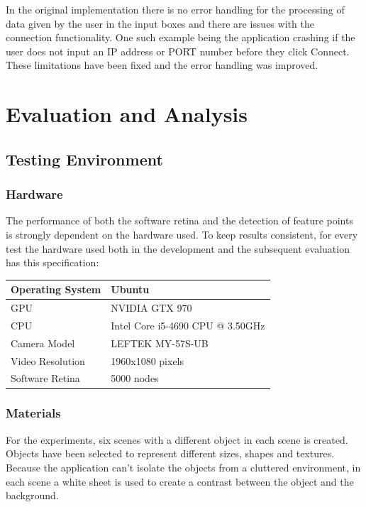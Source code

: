 \documentclass{l4proj}
\begin{document}
In the original implementation there is no error handling for the processing of data given by the user in the input boxes and there are issues with the connection functionality. One such example being the application crashing if the user does not input an IP address or PORT number before they click Connect. 
These limitations have been fixed and the error handling was improved.  









\chapter{Evaluation and Analysis}

\section{Testing Environment}
\subsection{Hardware}

The performance of both the software retina and the detection of feature points is strongly dependent on the hardware used. To keep results consistent, for every test the hardware used both in the development and the subsequent evaluation has this specification:

\begin{table}[H]
\centering
\begin{tabular}{l|l}
Operating System & Ubuntu\\ \hline
GPU & NVIDIA GTX 970 \\ \hline
CPU & Intel Core i5-4690 CPU @ 3.50GHz\\ \hline
Camera Model & LEFTEK MY-57S-UB \\ \hline
Video Resolution & 1960x1080 pixels \\ \hline
Software Retina & 5000 nodes

\end{tabular}
\end{table}


\subsection{Materials}
For the experiments, six scenes with a different object in each scene is created. Objects have been selected to represent different sizes, shapes and textures. Because the application can't isolate the objects from a cluttered environment, in each scene a white sheet is used to create a contrast between the object and the background.
\end{document}
